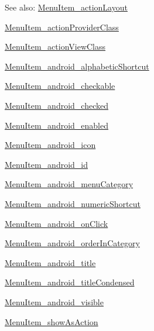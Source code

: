 \begin{Desc}
\item[See also:]\hyperlink{classandroid_1_1support_1_1v4_1_1_r_1_1styleable_a796f6f763b1b18c1f30a2dcfb9f5f72}{MenuItem\_\-actionLayout} 

\hyperlink{classandroid_1_1support_1_1v4_1_1_r_1_1styleable_4582e9564c219627c101073b05d99ca3}{MenuItem\_\-actionProviderClass} 

\hyperlink{classandroid_1_1support_1_1v4_1_1_r_1_1styleable_540db8eb18bf4f5b4d829924f23cf3ef}{MenuItem\_\-actionViewClass} 

\hyperlink{classandroid_1_1support_1_1v4_1_1_r_1_1styleable_e18b4d4aaf319c1b053a7a2b6e895ec4}{MenuItem\_\-android\_\-alphabeticShortcut} 

\hyperlink{classandroid_1_1support_1_1v4_1_1_r_1_1styleable_b68a374916d519737c3a28fed80dc49a}{MenuItem\_\-android\_\-checkable} 

\hyperlink{classandroid_1_1support_1_1v4_1_1_r_1_1styleable_2e34104aed0ac276e13e97441de38b68}{MenuItem\_\-android\_\-checked} 

\hyperlink{classandroid_1_1support_1_1v4_1_1_r_1_1styleable_202fdf83a524efca222f4f5d085c0628}{MenuItem\_\-android\_\-enabled} 

\hyperlink{classandroid_1_1support_1_1v4_1_1_r_1_1styleable_2c938bdde9b6c2d73c74e524bd9000a6}{MenuItem\_\-android\_\-icon} 

\hyperlink{classandroid_1_1support_1_1v4_1_1_r_1_1styleable_0d7c59b15e49342fd0002c967ac93807}{MenuItem\_\-android\_\-id} 

\hyperlink{classandroid_1_1support_1_1v4_1_1_r_1_1styleable_4ee75f908e53006cfb8e37bc47033aed}{MenuItem\_\-android\_\-menuCategory} 

\hyperlink{classandroid_1_1support_1_1v4_1_1_r_1_1styleable_a8c445a29006c1bc48e53880a916394f}{MenuItem\_\-android\_\-numericShortcut} 

\hyperlink{classandroid_1_1support_1_1v4_1_1_r_1_1styleable_fa40cc2323bbb032c868308d16e7d64e}{MenuItem\_\-android\_\-onClick} 

\hyperlink{classandroid_1_1support_1_1v4_1_1_r_1_1styleable_7976bdeaae19ffc9069033a5afb3458f}{MenuItem\_\-android\_\-orderInCategory} 

\hyperlink{classandroid_1_1support_1_1v4_1_1_r_1_1styleable_1723212f5e94f798ff04dbfee2d97cf8}{MenuItem\_\-android\_\-title} 

\hyperlink{classandroid_1_1support_1_1v4_1_1_r_1_1styleable_893c55eac75b4f4c10023c8c9326e6ee}{MenuItem\_\-android\_\-titleCondensed} 

\hyperlink{classandroid_1_1support_1_1v4_1_1_r_1_1styleable_f5ec2e318cacb05a88574400015d117b}{MenuItem\_\-android\_\-visible} 

\hyperlink{classandroid_1_1support_1_1v4_1_1_r_1_1styleable_97f9c113efa1633c7665e13fd89ade63}{MenuItem\_\-showAsAction} \end{Desc}
